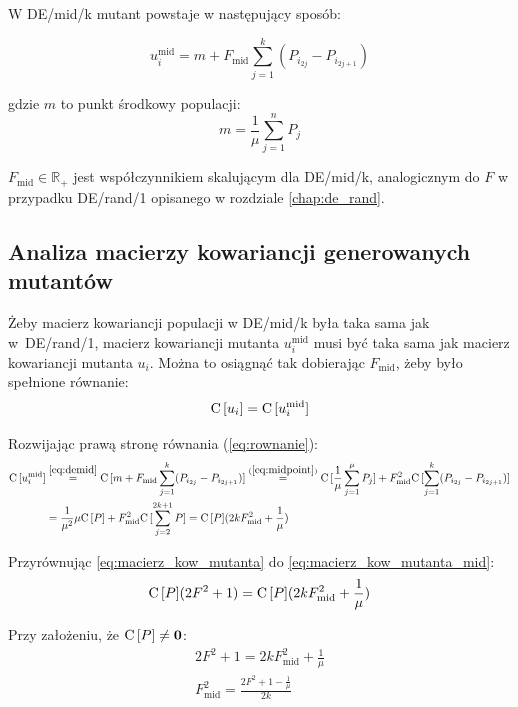 \documentclass[a4paper,onecolumn,oneside,12pt,wide,floatssmall]{mwrep}
\def\C{{\rm C}\,}
\theoremstyle{definition}
\theoremstyle{plain}%
\theoremstyle{remark}
\begin{document}
W DE/mid/k mutant powstaje w następujący sposób:

\begin{equation} \label{eq:demid}
u_i^\text{mid} = m + F_\text{mid}\sum\limits_{j=1}^k (P_{i_{2j}} - P_{i_{2j+1}})
\end{equation}

gdzie $m$ to punkt środkowy populacji:
\begin{equation} \label{eq:midpoint}
m = \frac{1}{\mu}\sum\limits_{j=1}^n P_j
\end{equation}

$F_\text{mid}\in\mathbb{R_+}$ jest współczynnikiem skalującym dla DE/mid/k, analogicznym do $F$ 
w przypadku DE/rand/1 opisanego w rozdziale \ref{chap:de_rand}. 

\subsection{Analiza macierzy kowariancji generowanych mutantów}

Żeby macierz kowariancji populacji w DE/mid/k była taka sama jak w~DE/rand/1, 
macierz kowariancji mutanta $u_i^\text{mid}$ musi być taka sama jak macierz kowariancji mutanta $u_i$.
Można to osiągnąć tak dobierając $F_\text{mid}$, żeby było spełnione równanie:
\begin{equation} \label{eq:rownanie}
\C[u_i] = \C[u_i^\text{mid}]
\end{equation}

Rozwijając prawą stronę równania (\ref{eq:rownanie}):
\begin{equation}
\begin{align}
\label{eq:macierz_kow_mutanta_mid}
\C[u_i^\text{mid}] &\overset{\eqref{eq:demid}}{=} \C[m + F_\text{mid}\sum\limits_{j=1}^k (P_{i_{2j}} - P_{i_{2j+1}})] 
\overset{(\ref{eq:midpoint})}{=} \C[\frac{1}{\mu}\sum\limits_{j=1}^\mu P_j] + F_\text{mid}^2\C[\sum\limits_{j=1}^k (P_{i_{2j}} - P_{i_{2j+1}})] \\
&= \frac{1}{\mu^2}\mu\C[P] + F_\text{mid}^2\C[\sum\limits_{j=2}^{2k+1} P] = \C[P](2kF_\text{mid}^2 + \frac{1}{\mu})
\end{align}
\end{equation}

Przyrównując \eqref{eq:macierz_kow_mutanta} do \eqref{eq:macierz_kow_mutanta_mid}:
\begin{align*}
\C[P](2F^2 + 1) = \C[P](2kF_\text{mid}^2 + \frac{1}{\mu})
\end{align*}

Przy założeniu, że $\C[P] \neq \textbf{0}$:
\begin{align*}
2F^2 + 1 = 2kF_\text{mid}^2 + \frac{1}{\mu} \\
F_\text{mid}^2 = \frac{2F^2 + 1 - \frac{1}{\mu}}{2k}
\end{align*}
\end{document}
